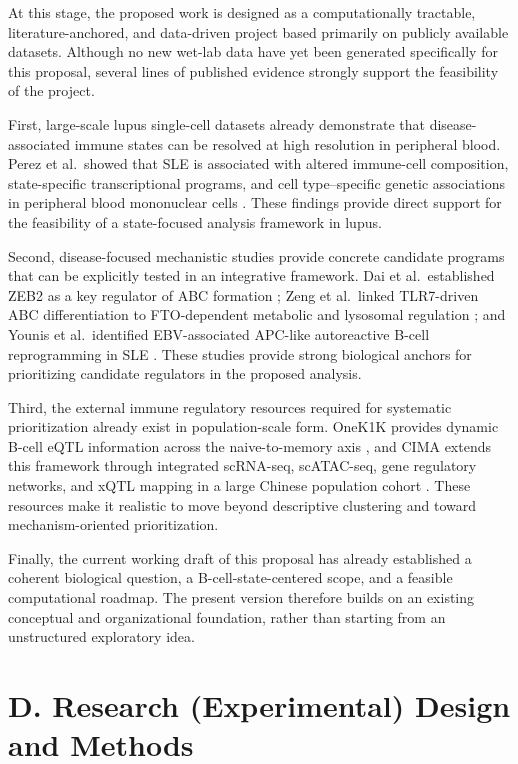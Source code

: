 \documentclass[12pt, a4paper]{article}
\begin{document}
At this stage, the proposed work is designed as a computationally tractable, literature-anchored, and data-driven project based primarily on publicly available datasets. Although no new wet-lab data have yet been generated specifically for this proposal, several lines of published evidence strongly support the feasibility of the project.

First, large-scale lupus single-cell datasets already demonstrate that disease-associated immune states can be resolved at high resolution in peripheral blood. Perez et al.\ showed that SLE is associated with altered immune-cell composition, state-specific transcriptional programs, and cell type--specific genetic associations in peripheral blood mononuclear cells \cite{Perez2022}. These findings provide direct support for the feasibility of a state-focused analysis framework in lupus.

Second, disease-focused mechanistic studies provide concrete candidate programs that can be explicitly tested in an integrative framework. Dai et al.\ established ZEB2 as a key regulator of ABC formation \cite{Dai2024}; Zeng et al.\ linked TLR7-driven ABC differentiation to FTO-dependent metabolic and lysosomal regulation \cite{Zeng2025}; and Younis et al.\ identified EBV-associated APC-like autoreactive B-cell reprogramming in SLE \cite{Younis2025}. These studies provide strong biological anchors for prioritizing candidate regulators in the proposed analysis.

Third, the external immune regulatory resources required for systematic prioritization already exist in population-scale form. OneK1K provides dynamic B-cell eQTL information across the naive-to-memory axis \cite{Yazar2022}, and CIMA extends this framework through integrated scRNA-seq, scATAC-seq, gene regulatory networks, and xQTL mapping in a large Chinese population cohort \cite{Yin2026}. These resources make it realistic to move beyond descriptive clustering and toward mechanism-oriented prioritization.

Finally, the current working draft of this proposal has already established a coherent biological question, a B-cell-state-centered scope, and a feasible computational roadmap. The present version therefore builds on an existing conceptual and organizational foundation, rather than starting from an unstructured exploratory idea.

\section*{D. Research (Experimental) Design and Methods}
\end{document}
